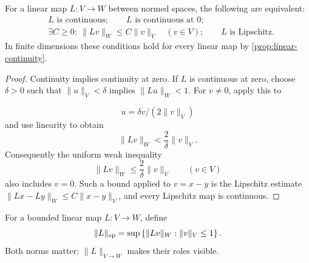 \begin{theorem}
\label{thm:bounded-linear-equivalences}
For a linear map $L:V\to W$ between normed spaces, the following are
equivalent:
\[
\begin{aligned}
&L\text{ is continuous};\qquad
L\text{ is continuous at }0;\\
&\exists C\geq0:\ \|Lv\|_W\leq C\|v\|_V\quad(v\in V);\qquad
L\text{ is Lipschitz}.
\end{aligned}
\]
In finite dimensions these conditions hold for every linear map by
\cref{prop:linear-continuity}.
\end{theorem}
\begin{proof}
Continuity implies continuity at zero. If $L$ is continuous at zero, choose
$\delta>0$ such that $\|u\|_V<\delta$ implies $\|Lu\|_W<1$. For
$v\ne0$, apply this to

\[
u=\delta v/(2\|v\|_V)
\]
 and use linearity to obtain
\[
\|Lv\|_W<\frac{2}{\delta}\|v\|_V.
\]
Consequently the uniform weak inequality
\[
\|Lv\|_W\leq\frac{2}{\delta}\|v\|_V
\qquad(v\in V)
\]
also includes $v=0$. Such a bound applied to $v=x-y$ is the
Lipschitz estimate
$\|Lx-Ly\|_W\leq C\|x-y\|_V$, and every Lipschitz map is continuous.
\end{proof}

\begin{definition}
For a bounded linear map $L:V\to W$, define
\[
\lVert L\rVert_{\mathrm{op}}
=\sup\left\{\lVert Lv\rVert_W:\lVert v\rVert_V\leq1\right\}.
\]
Both norms matter; $\|L\|_{V\to W}$ makes their roles visible.
\end{definition}

